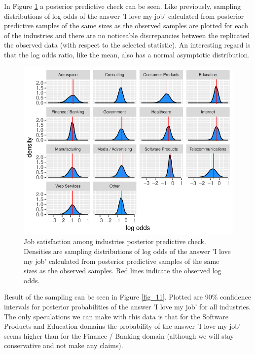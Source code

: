 \documentclass{article}
\begin{document}
In Figure \ref{fig_10} a posterior predictive check can be seen. Like previously, sampling distributions of log odds of the answer 'I love my job' calculated from posterior predictive samples of the same sizes as the observed samples are plotted for each of the industries and there are no noticeable discrepancies between the replicated the observed data (with respect to the selected statistic). An interesting regard is that the log odds ratio, like the mean, also has a normal asymptotic distribution.





\begin{figure}[H]
\centering
\includegraphics{report-036}
\caption{Job satisfaction among industries posterior predictive check. Densities are sampling distributions of log odds of the answer 'I love my job' calculated from posterior predictive samples of the same sizes as the observed samples. Red lines indicate the observed log odds.}\label{fig_10}
\end{figure}

Result of the sampling can be seen in Figure \ref{fig_11}. Plotted are 90\% confidence intervals for posterior probabilities of the answer 'I love my job' for all industries. The only speculations we can make with this data is that for the Software Products and Education domains the probability of the answer 'I love my job' seems higher than for the Finance / Banking domain (although we will stay conservative and not make any claims).
\end{document}
